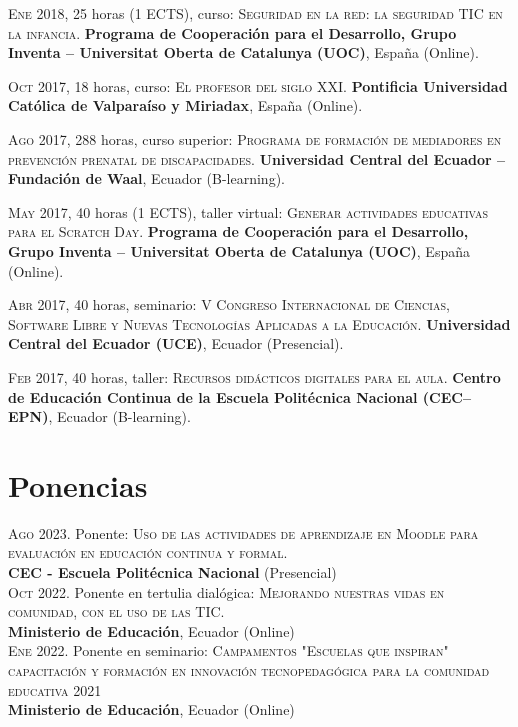\documentclass[a4paper]{article}
\begin{document}
\textsc{Ene} 2018, 25 horas (1 ECTS), curso: \textsc{Seguridad en la red: la seguridad TIC en la infancia}.
\textbf{Programa de Cooperación para el Desarrollo, Grupo Inventa -- Universitat Oberta de Catalunya (UOC)}, España (Online).

\textsc{Oct} 2017, 18 horas, curso: \textsc{El profesor del siglo XXI}.
\textbf{Pontificia Universidad Católica de Valparaíso y Miriadax}, España (Online).

\textsc{Ago} 2017, 288 horas, curso superior: \textsc{Programa de formación de mediadores en prevención prenatal de discapacidades}.
\textbf{Universidad Central del Ecuador -- Fundación de Waal}, Ecuador (B-learning).

\textsc{May} 2017, 40 horas (1 ECTS), taller virtual: \textsc{Generar actividades educativas para el Scratch Day}.
\textbf{Programa de Cooperación para el Desarrollo, Grupo Inventa -- Universitat Oberta de Catalunya (UOC)}, España (Online).

\textsc{Abr} 2017, 40 horas, seminario: \textsc{V Congreso Internacional de Ciencias, Software Libre y Nuevas Tecnologías Aplicadas a la Educación}.
\textbf{Universidad Central del Ecuador (UCE)}, Ecuador (Presencial).

\textsc{Feb} 2017, 40 horas, taller: \textsc{Recursos didácticos digitales para el aula}.
\textbf{Centro de Educación Continua de la Escuela Politécnica Nacional (CEC--EPN)}, Ecuador (B-learning).



\section{Ponencias}
\textsc{Ago} 2023. Ponente: \textsc{Uso de las actividades de aprendizaje en Moodle para evaluación en educación continua y formal}.\\
\textbf{CEC - Escuela Politécnica Nacional} (Presencial) \\


\textsc{Oct} 2022. Ponente en tertulia dialógica: \textsc{Mejorando nuestras vidas en comunidad, con el uso de las TIC}.\\
\textbf{ Ministerio de Educación}, Ecuador (Online) \\

\textsc{Ene} 2022. Ponente en seminario: \textsc{Campamentos "Escuelas que inspiran" capacitación y formación en innovación tecnopedagógica para la comunidad educativa 2021} \\
\textbf{ Ministerio de Educación}, Ecuador (Online) \\
\end{document}
